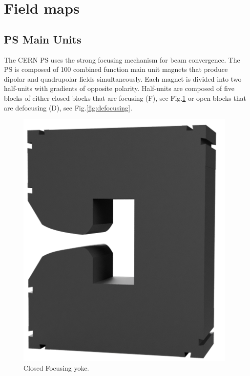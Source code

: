 \documentclass[a4paper,
               biblatex,     %
               keeplastbox,   %
               ]{jacow}
\begin{document}
\section{Field maps}
\subsection{PS Main Units}
The CERN PS uses the strong focusing mechanism for beam convergence. The PS is composed of 100 combined function main unit magnets that produce dipolar and quadrupolar fields simultaneously. Each magnet is divided into two half-units with gradients of opposite polarity. Half-units are composed of five blocks of either closed blocks that are focusing (F), see Fig.\ref{fig:focusing} or open blocks that are defocusing (D), see Fig.\ref{fig:defocusing}.

\begin{figure}[!htb]
  \centering
  \begin{minipage}[b]{0.45\columnwidth}
    \includegraphics*[width=\textwidth]{focusing}
    \caption{Closed Focusing yoke.}
    \label{fig:focusing}
  \end{minipage}

\end{figure}
\end{document}
